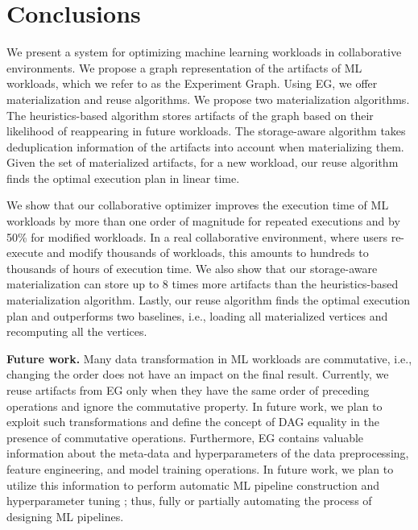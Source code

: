 \section{Conclusions} \label{sec-conclusion}
We present a system for optimizing machine learning workloads in collaborative environments.
We propose a graph representation of the artifacts of ML workloads, which we refer to as the Experiment Graph.
Using EG, we offer materialization and reuse algorithms.
We propose two materialization algorithms.
The heuristics-based algorithm stores artifacts of the graph based on their likelihood of reappearing in future workloads.
The storage-aware algorithm takes deduplication information of the artifacts into account when materializing them.
Given the set of materialized artifacts, for a new workload, our reuse algorithm finds the optimal execution plan in linear time.

We show that our collaborative optimizer improves the execution time of ML workloads by more than one order of magnitude for repeated executions and by 50\% for modified workloads.
In a real collaborative environment, where users re-execute and modify thousands of workloads, this amounts to hundreds to thousands of hours of execution time.
We also show that our storage-aware materialization can store up to 8 times more artifacts than the heuristics-based materialization algorithm.
Lastly, our reuse algorithm finds the optimal execution plan and outperforms two baselines, i.e., loading all materialized vertices and recomputing all the vertices.

\textbf{Future work.}
Many data transformation in ML workloads are commutative, i.e., changing the order does not have an impact on the final result.
Currently, we reuse artifacts from EG only when they have the same order of preceding operations and ignore the commutative property.
In future work, we plan to exploit such transformations and define the concept of DAG equality in the presence of commutative operations.
Furthermore, EG contains valuable information about the meta-data and hyperparameters of the data preprocessing, feature engineering, and model training operations.
In future work, we plan to utilize this information to perform automatic ML pipeline construction and hyperparameter tuning \cite{Feurer15, thornton2013auto, shang2019democratizing}; thus, fully or partially automating the process of designing ML pipelines.